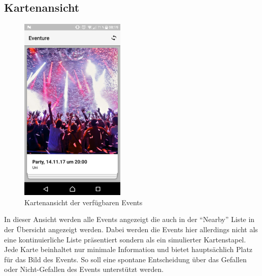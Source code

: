 \documentclass{scrartcl}
\begin{document}
\subsection{Kartenansicht}

\begin{figure}[h!tbp]
  \centering
  \includegraphics[width=5cm]{img/cardview}
  \caption{Kartenansicht der verfügbaren Events}
\end{figure}

In dieser Ansicht werden alle Events angezeigt die auch in der \enquote{Nearby}
Liste in der Übersicht angezeigt werden. Dabei werden die Events hier allerdings
nicht als eine kontinuierliche Liste präsentiert sondern als ein simulierter
Kartenstapel. Jede Karte beinhaltet nur minimale Information und bietet
hauptsächlich Platz für das Bild des Events. So soll eine spontane Entscheidung
über das Gefallen oder Nicht-Gefallen des Events unterstützt werden.
\end{document}
